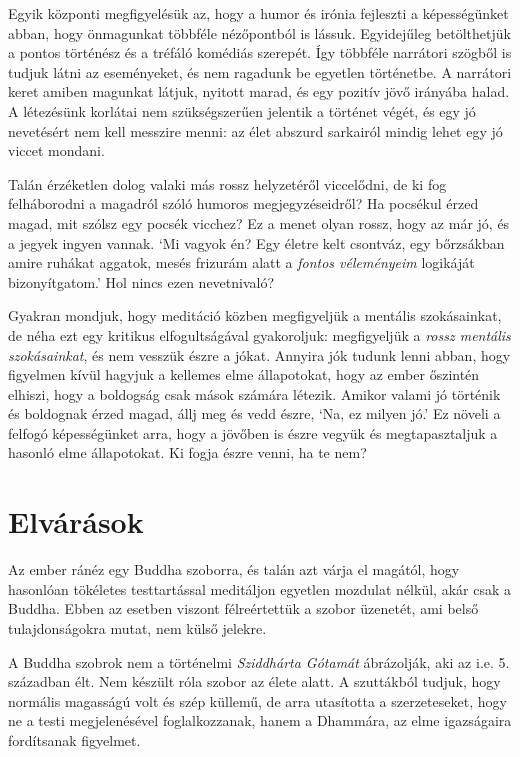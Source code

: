 Egyik központi megfigyelésük az, hogy a humor és irónia fejleszti a
képességünket abban, hogy önmagunkat többféle nézőpontból is lássuk.
Egyidejűleg betölthetjük a pontos történész és a tréfáló komédiás
szerepét. Így többféle narrátori szögből is tudjuk látni az eseményeket,
és nem ragadunk be egyetlen történetbe. A narrátori keret amiben
magunkat látjuk, nyitott marad, és egy pozitív jövő irányába halad. A
létezésünk korlátai nem szükségszerűen jelentik a történet végét, és egy
jó nevetésért nem kell messzire menni: az élet abszurd sarkairól mindig
lehet egy jó viccet mondani.

Talán érzéketlen dolog valaki más rossz helyzetéről viccelődni, de ki
fog felháborodni a magadról szóló humoros megjegyzéseidről? Ha pocsékul
érzed magad, mit szólsz egy pocsék vicchez? Ez a menet olyan rossz, hogy
az már jó, és a jegyek ingyen vannak. `Mi vagyok én? Egy életre kelt
csontváz, egy bőrzsákban amire ruhákat aggatok, mesés frizurám alatt a
\emph{fontos véleményeim} logikáját bizonyítgatom.' Hol nincs ezen
nevetnivaló?

Gyakran mondjuk, hogy meditáció közben megfigyeljük a mentális
szokásainkat, de néha ezt egy kritikus elfogultságával gyakoroljuk:
megfigyeljük a \emph{rossz mentális szokásainkat}, és nem vesszük észre
a jókat. Annyira jók tudunk lenni abban, hogy figyelmen kívül hagyjuk a
kellemes elme állapotokat, hogy az ember őszintén elhiszi, hogy a
boldogság csak mások számára létezik. Amikor valami jó történik és
boldognak érzed magad, állj meg és vedd észre, `Na, ez milyen jó.' Ez
növeli a felfogó képességünket arra, hogy a jövőben is észre vegyük és
megtapasztaljuk a hasonló elme állapotokat. Ki fogja észre venni, ha te
nem?

\clearpage

\section{Elvárások}


\noindent Az ember ránéz egy Buddha szoborra, és talán azt várja el
magától, hogy hasonlóan tökéletes testtartással meditáljon egyetlen
mozdulat nélkül, akár csak a Buddha. Ebben az esetben viszont
félreértettük a szobor üzenetét, ami belső tulajdonságokra mutat, nem
külső jelekre.

A Buddha szobrok nem a történelmi \emph{Sziddhárta Gótamát} ábrázolják,
aki az i.e. 5. században élt. Nem készült róla szobor az élete alatt. A
szuttákból tudjuk, hogy normális magasságú volt és szép küllemű, de arra
utasította a szerzeteseket, hogy ne a testi megjelenésével
foglalkozzanak, hanem a Dhammára, az elme igazságaira fordítsanak
figyelmet.

